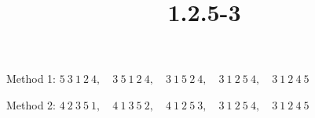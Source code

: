 \documentclass{article}
\title{1.2.5-3}
\begin{document}
\maketitle

Method 1: $5\ 3\ 1\ 2\ 4,\quad 3\ 5\ 1\ 2\ 4,\quad 3\ 1\ 5\ 2\ 4,\quad 3\ 1\ 2\ 5\ 4,\quad 3\ 1\ 2\ 4\ 5$

Method 2: $4\ 2\ 3\ 5\ 1,\quad 4\ 1\ 3\ 5\ 2,\quad 4\ 1\ 2\ 5\ 3,\quad 3\ 1\ 2\ 5\ 4,\quad 3\ 1\ 2\ 4\ 5$
\end{document}
